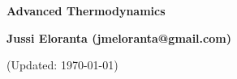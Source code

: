 \documentclass[serif]{beamer}
\begin{document}
\phantom{hauki}
\vfill
\begin{center}
\textbf{Advanced Thermodynamics}\\

\vspace{1cm}

\textbf{Jussi Eloranta (jmeloranta@gmail.com)}\\

\vspace{1cm}

{\tiny (Updated: \today)}

\end{center}
\vfill
\newpage




%
%
%
%
%
%
%

%
\end{document}
